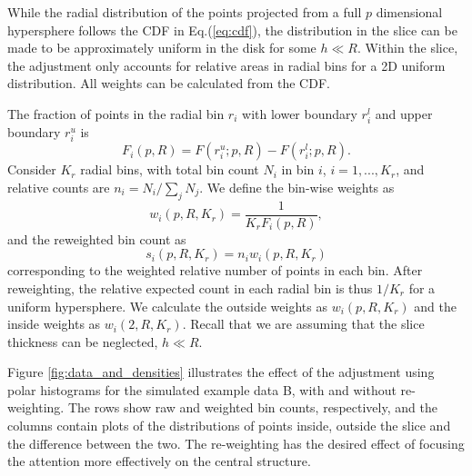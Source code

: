 \documentclass[]{interact}
\theoremstyle{plain}%
\theoremstyle{definition}
\theoremstyle{remark}
\begin{document}
While the radial distribution of the points projected from a full \(p\)
dimensional hypersphere follows the CDF in Eq.(\ref{eq:cdf}), the
distribution in the slice can be made to be approximately uniform in the
disk for some \(h \ll R\). Within the slice, the adjustment only
accounts for relative areas in radial bins for a 2D uniform
distribution. All weights can be calculated from the CDF.

The fraction of points in the radial bin \(r_i\) with lower boundary
\(r_i^l\) and upper boundary \(r_i^u\) is \begin{equation}
F_{i}(p, R) = F(r_i^u; p, R) - F(r_i^l; p, R).
\label{eq:frac}
\end{equation} Consider \(K_r\) radial bins, with total bin count
\(N_i\) in bin \(i\), \(i = 1,...,K_r\), and relative counts are
\(n_i = N_i / \sum_j N_j\). We define the bin-wise weights as
\begin{equation}
w_i(p, R, K_r) = \frac{1}{K_r F_i(p,R)},
\end{equation} and the reweighted bin count as \begin{equation}
s_i(p, R, K_r) = n_i w_i(p, R, K_r)
\label{eq:reweight}
\end{equation} corresponding to the weighted relative number of points
in each bin. After reweighting, the relative expected count in each
radial bin is thus \(1/K_r\) for a uniform hypersphere. We calculate the
outside weights as \(w_i(p, R, K_r)\) and the inside weights as
\(w_i(2, R, K_r)\). Recall that we are assuming that the slice thickness
can be neglected, \(h\ll R\).

Figure \ref{fig:data_and_densities} illustrates the effect of the
adjustment using polar histograms for the simulated example data B, with
and without re-weighting. The rows show raw and weighted bin counts,
respectively, and the columns contain plots of the distributions of
points inside, outside the slice and the difference between the two. The
re-weighting has the desired effect of focusing the attention more
effectively on the central structure.
\end{document}
